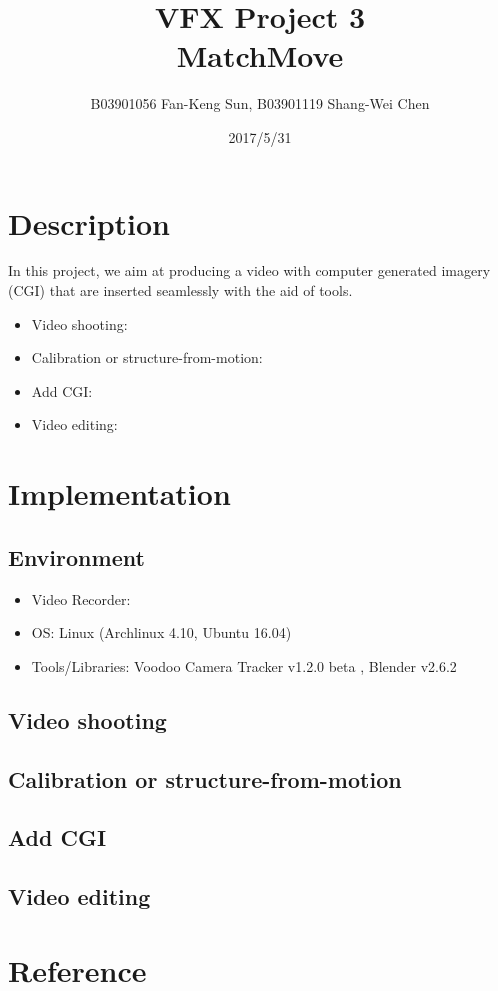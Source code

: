 \documentclass[11pt]{article}
\title{\bf{VFX Project 3\\\large{MatchMove}}\vspace{-10pt}}
\author{B03901056 Fan-Keng Sun, B03901119 Shang-Wei Chen}
\date{2017/5/31}
\begin{document}
\maketitle
\section{Description}
In this project, we aim at producing a video with computer generated imagery (CGI) that are inserted seamlessly with the aid of tools.
\begin{itemize}
  \itemsep=0pt
  \item Video shooting: 
  \item Calibration or structure-from-motion:
  \item Add CGI:
  \item Video editing:
\end{itemize}
\section{Implementation}
\subsection{Environment}
\begin{itemize}
  \itemsep=0pt
  \item Video Recorder:
  \item OS: Linux (Archlinux 4.10, Ubuntu 16.04)
  \item Tools/Libraries: Voodoo Camera Tracker v1.2.0 beta \cite{ref:voodoo}, Blender v2.6.2 \cite{ref:blender}
\end{itemize}

\subsection{Video shooting}
\subsection{Calibration or structure-from-motion}
\subsection{Add CGI}
\subsection{Video editing}
\section{Reference}


\end{document}
